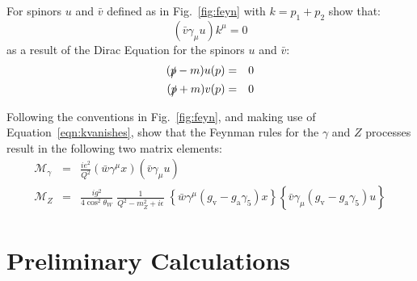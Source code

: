 \documentclass[12pt]{article}
\newcommand{\gv} {\ensuremath{g_{\mathrm v}}}
\newcommand{\ga} {\ensuremath{g_{\mathrm a}}}
\newcommand{\ps}{\ensuremath{\slashed{p}}}
\begin{document}
\begin{Exercise}
For spinors $u$ and $\bar{v}$ defined as in Fig.~\ref{fig:feyn} with $k = p_1 + p_2$ show that:
\begin{equation}
  \left( \bar{v} \gamma_\mu u \right) k^\mu = 0 \label{eqn:kvanishes}
\end{equation}
as a result of the Dirac Equation for the spinors $u$ and $\bar{v}$:
\begin{eqnarray*}
(\ps-m)  u(p) &=&  0 \\
(\ps+m) v(p) &=&  0
\end{eqnarray*}
\end{Exercise}

\begin{Exercise}
Following the conventions in Fig.~\ref{fig:feyn}, and making use of Equation~\ref{eqn:kvanishes}, show that the Feynman rules for the $\gamma$ and $Z$ processes result in the following two matrix elements:
\begin{eqnarray}
\mathcal{M}_\gamma &=&  \frac{ie^2}{Q^2} \left( \bar{w} \gamma^\mu x \right) \left( \bar{v} \gamma_\mu u \right) \label{eqn:mg}\\ 
\mathcal{M}_Z &=& \frac{ig^2}{4\cos^2\theta_W}\; \frac{1}{Q^2-m_Z^2 + i \epsilon} \; \left\{ \bar{w} \gamma^\mu  (\gv-\ga\gamma_5) x \right\} \left\{ \bar{v} \gamma_\mu (\gv-\ga\gamma_5) u \right\} \label{eqn:mz}
\end{eqnarray}
\end{Exercise}

\section{Preliminary Calculations}
\end{document}
